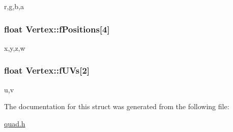 r,g,b,a 

\hypertarget{struct_vertex_a1eafaa856610861f7e9b8bf82c2bdc81}{}
\subsubsection[{f\+Positions}]{\setlength{\rightskip}{0pt plus 5cm}float Vertex\+::f\+Positions\mbox{[}4\mbox{]}}\label{struct_vertex_a1eafaa856610861f7e9b8bf82c2bdc81}


x,y,z,w 

\hypertarget{struct_vertex_acfa03b8678b2c3564fd3742d7da66c89}{}
\subsubsection[{f\+U\+Vs}]{\setlength{\rightskip}{0pt plus 5cm}float Vertex\+::f\+U\+Vs\mbox{[}2\mbox{]}}\label{struct_vertex_acfa03b8678b2c3564fd3742d7da66c89}


u,v 



The documentation for this struct was generated from the following file\+:\begin{DoxyCompactItemize}
\item 
\hyperlink{quad_8h}{quad.\+h}\end{DoxyCompactItemize}
